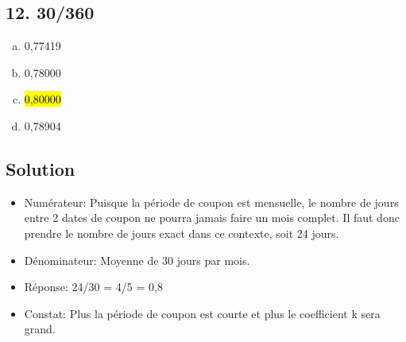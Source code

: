 \documentclass[10pt,a4paper]{article}
\begin{document}
\newpage


\subsection*{12.  30/360}
\begin{enumerate}[a)]
\item 0,77419  
\item 0,78000 
\item \hl{0,80000}
\item 0,78904
\end{enumerate}
\subsection*{Solution}
\begin{itemize}
\item Numérateur: Puisque la période de coupon est mensuelle, le nombre de jours entre 2 dates de coupon ne pourra jamais faire un mois complet. Il faut donc prendre le nombre de jours exact dans ce contexte, soit 24 jours.
\item Dénominateur: Moyenne de 30 jours par mois. 
\item Réponse: 24/30 = 4/5 = 0,8
\item Constat: Plus la période de coupon est courte et plus le coefficient k sera grand. 
\end{itemize}
\end{document}
